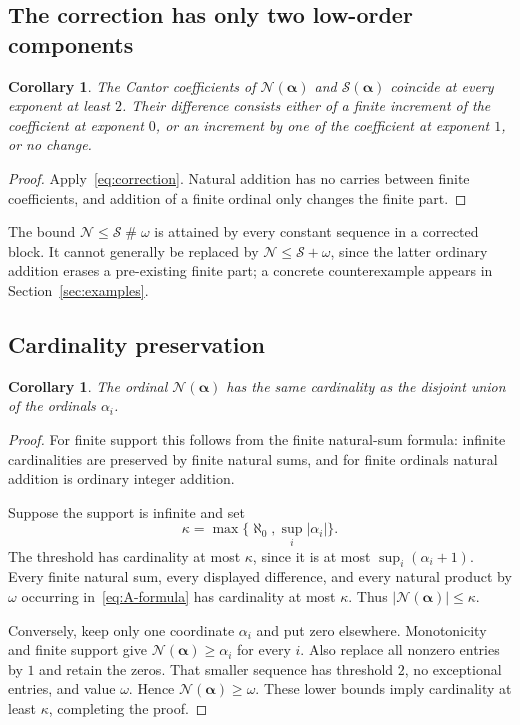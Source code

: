 \documentclass[11pt,letterpaper]{article}
\newtheorem{corollary}[theorem]{Corollary}
\theoremstyle{definition}
\theoremstyle{remark}
\newcommand{\Nop}{\mathcal N}
\newcommand{\Sop}{\mathcal S}
\newcommand{\seq}[1]{\boldsymbol{#1}}
\newcommand{\ns}{\mathbin{\#}}
\begin{document}
\subsection{The correction has only two low-order components}

\begin{corollary}\label{cor:low-order}
The Cantor coefficients of $\Nop(\seq\alpha)$ and $\Sop(\seq\alpha)$ coincide at every exponent at least $2$. Their difference consists either of a finite increment of the coefficient at exponent $0$, or an increment by one of the coefficient at exponent $1$, or no change.
\end{corollary}
\begin{proof}
Apply~\eqref{eq:correction}. Natural addition has no carries between finite coefficients, and addition of a finite ordinal only changes the finite part.
\end{proof}

The bound $\Nop\le\Sop\ns\omega$ is attained by every constant sequence in a corrected block. It cannot generally be replaced by $\Nop\le\Sop+\omega$, since the latter ordinary addition erases a pre-existing finite part; a concrete counterexample appears in Section~\ref{sec:examples}.

\subsection{Cardinality preservation}

\begin{corollary}\label{cor:cardinality}
The ordinal $\Nop(\seq\alpha)$ has the same cardinality as the disjoint union of the ordinals $\alpha_i$.
\end{corollary}
\begin{proof}
For finite support this follows from the finite natural-sum formula: infinite cardinalities are preserved by finite natural sums, and for finite ordinals natural addition is ordinary integer addition.

Suppose the support is infinite and set
\[
 \kappa=\max\{\aleph_0,\sup_i|\alpha_i|\}.
\]
The threshold has cardinality at most $\kappa$, since it is at most $\sup_i(\alpha_i+1)$. Every finite natural sum, every displayed difference, and every natural product by $\omega$ occurring in~\eqref{eq:A-formula} has cardinality at most $\kappa$. Thus $|\Nop(\seq\alpha)|\le\kappa$.

Conversely, keep only one coordinate $\alpha_i$ and put zero elsewhere. Monotonicity and finite support give $\Nop(\seq\alpha)\ge\alpha_i$ for every $i$. Also replace all nonzero entries by $1$ and retain the zeros. That smaller sequence has threshold $2$, no exceptional entries, and value $\omega$. Hence $\Nop(\seq\alpha)\ge\omega$. These lower bounds imply cardinality at least $\kappa$, completing the proof.
\end{proof}
\end{document}

